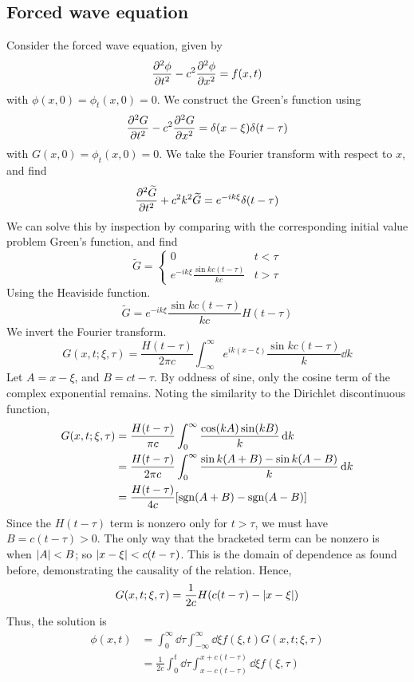 \documentclass[a4paper]{article}
\begin{document}
\subsection{Forced wave equation}
Consider the forced wave equation, given by
\[
	\pdv[2]{\phi}{t} - c^2 \pdv[2]{\phi}{x} = f(x,t)
\]
with \( \phi(x,0) = \phi_t(x,0) = 0 \).
We construct the Green's function using
\[
	\pdv[2]{G}{t} - c^2 \pdv[2]{G}{x} = \delta(x-\xi)\delta(t-\tau)
\]
with \( G(x,0) = \phi_t(x,0) = 0 \).
We take the Fourier transform with respect to \( x \), and find
\[
	\pdv[2]{\widetilde G}{t} + c^2 k^2 \widetilde G = e^{-ik\xi} \delta(t - \tau)
\]
We can solve this by inspection by comparing with the corresponding initial value problem Green's function, and find
\[
	\widetilde G = \begin{cases}
		0                                       & t < \tau \\
		e^{-ik\xi} \frac{\sin kc(t - \tau)}{kc} & t > \tau
	\end{cases}
\]
Using the Heaviside function.
\[
	\widetilde G = e^{-ik\xi} \frac{\sin kc(t - \tau)}{kc} H(t - \tau)
\]
We invert the Fourier transform.
\[
	G(x,t;\xi,\tau) = \frac{H(t-\tau)}{2\pi c} \int_{-\infty}^\infty e^{ik(x - \xi)} \frac{\sin kc(t - \tau)}{k} \dd{k}
\]
Let \( A = x - \xi \), and \( B = ct - \tau \).
By oddness of sine, only the cosine term of the complex exponential remains.
Noting the similarity to the Dirichlet discontinuous function,
\begin{align*}
	G(x,t;\xi,\tau) & = \frac{H(t-\tau)}{\pi c} \int_0^\infty \frac{\cos(kA) \sin(kB)}{k} \dd{k}          \\
	                & = \frac{H(t-\tau)}{2\pi c} \int_0^\infty \frac{\sin k(A+B) - \sin k(A-B)}{k} \dd{k} \\
	                & = \frac{H(t-\tau)}{4c} \qty[ \operatorname{sgn}(A+B) - \operatorname{sgn}(A-B) ]
\end{align*}
Since the \( H(t - \tau) \) term is nonzero only for \( t > \tau \), we must have \( B = c(t-\tau) > 0 \).
The only way that the bracketed term can be nonzero is when \( \abs{A} < B \); so \( \abs{x - \xi} < c(t-\tau) \).
This is the domain of dependence as found before, demonstrating the causality of the relation.
Hence,
\[
	G(x,t;\xi,\tau) = \frac{1}{2c} H(c(t-\tau) - \abs{x - \xi})
\]
Thus, the solution is
\begin{align*}
	\phi(x,t) & = \int_0^\infty \dd{\tau} \int_{-\infty}^\infty \dd{\xi} f(\xi, t) G(x,t;\xi,\tau)             \\
	          & = \frac{1}{2c} \int_0^t \dd{\tau} \int_{x - c(t-\tau)}^{x + c(t - \tau)} \dd{\xi} f(\xi, \tau)
\end{align*}
\end{document}
